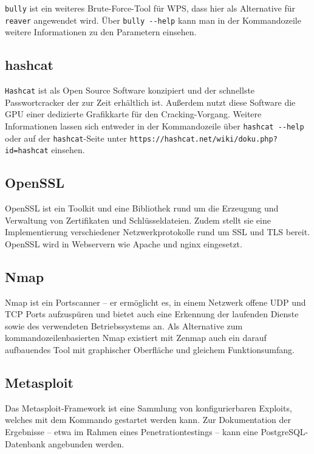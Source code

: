 \colorbox{altgray}{\lstinline|bully|} ist ein weiteres Brute-Force-Tool für WPS, dass hier als Alternative für \colorbox{altgray}{\lstinline|reaver|} angewendet wird. Über \colorbox{altgray}{\lstinline|bully --help|} kann man in der Kommandozeile weitere Informationen zu den Parametern einsehen.

\subsection{hashcat}
\colorbox{altgray}{\lstinline|Hashcat|} ist als Open Source Software konzipiert und der schnellste Passwortcracker der zur Zeit erhältlich ist. Außerdem nutzt diese Software die GPU einer dedizierte Grafikkarte für den Cracking-Vorgang. Weitere Informationen lassen sich entweder in der Kommandozeile über \colorbox{altgray}{\lstinline|hashcat --help|} oder auf der \colorbox{altgray}{\lstinline|hashcat|}-Seite unter \colorbox{altgray}{\lstinline|https://hashcat.net/wiki/doku.php?id=hashcat|} einsehen.

\subsection{OpenSSL}
OpenSSL ist ein Toolkit und eine Bibliothek rund um die Erzeugung und Verwaltung von Zertifikaten und Schlüsseldateien. Zudem stellt sie eine Implementierung verschiedener Netzwerkprotokolle rund um SSL und TLS bereit. OpenSSL wird in Webservern wie Apache und nginx eingesetzt.

\subsection{Nmap}
Nmap ist ein Portscanner -- er ermöglicht es, in einem Netzwerk offene UDP und TCP Ports aufzuspüren und bietet auch eine Erkennung der laufenden Dienste sowie des verwendeten Betriebssystems an. Als Alternative zum kommandozeilenbasierten Nmap existiert mit Zenmap auch ein darauf aufbauendes Tool mit graphischer Oberfläche und gleichem Funktionsumfang.

\subsection{Metasploit}

Das Metasploit-Framework ist eine Sammlung von konfigurierbaren Exploits, welches mit dem Kommando  gestartet werden kann. Zur Dokumentation der Ergebnisse -- etwa im Rahmen eines Penetrationtestings -- kann eine PostgreSQL-Datenbank angebunden werden.

